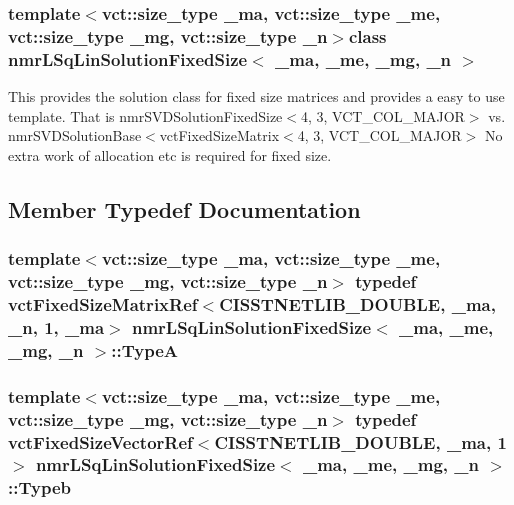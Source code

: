\subsubsection*{template$<$vct\+::size\+\_\+type \+\_\+ma, vct\+::size\+\_\+type \+\_\+me, vct\+::size\+\_\+type \+\_\+mg, vct\+::size\+\_\+type \+\_\+n$>$class nmr\+L\+Sq\+Lin\+Solution\+Fixed\+Size$<$ \+\_\+ma, \+\_\+me, \+\_\+mg, \+\_\+n $>$}

This provides the solution class for fixed size matrices and provides a easy to use template. That is nmr\+S\+V\+D\+Solution\+Fixed\+Size$<$4, 3, V\+C\+T\+\_\+\+C\+O\+L\+\_\+\+M\+A\+J\+O\+R$>$ vs. nmr\+S\+V\+D\+Solution\+Base$<$vct\+Fixed\+Size\+Matrix$<$4, 3, V\+C\+T\+\_\+\+C\+O\+L\+\_\+\+M\+A\+J\+O\+R$>$ No extra work of allocation etc is required for fixed size. 

\subsection{Member Typedef Documentation}
\hypertarget{classnmr_l_sq_lin_solution_fixed_size_a7a9b41c20d4c0b44cdae4bf7b39f7e39}{}
\subsubsection[{Type\+A}]{\setlength{\rightskip}{0pt plus 5cm}template$<$vct\+::size\+\_\+type \+\_\+ma, vct\+::size\+\_\+type \+\_\+me, vct\+::size\+\_\+type \+\_\+mg, vct\+::size\+\_\+type \+\_\+n$>$ typedef {\bf vct\+Fixed\+Size\+Matrix\+Ref}$<$C\+I\+S\+S\+T\+N\+E\+T\+L\+I\+B\+\_\+\+D\+O\+U\+B\+L\+E, \+\_\+ma, \+\_\+n, 1, \+\_\+ma$>$ {\bf nmr\+L\+Sq\+Lin\+Solution\+Fixed\+Size}$<$ \+\_\+ma, \+\_\+me, \+\_\+mg, \+\_\+n $>$\+::{\bf Type\+A}}\label{classnmr_l_sq_lin_solution_fixed_size_a7a9b41c20d4c0b44cdae4bf7b39f7e39}
\hypertarget{classnmr_l_sq_lin_solution_fixed_size_a9fca08d2c610b0087085dd343e5d171b}{}
\subsubsection[{Typeb}]{\setlength{\rightskip}{0pt plus 5cm}template$<$vct\+::size\+\_\+type \+\_\+ma, vct\+::size\+\_\+type \+\_\+me, vct\+::size\+\_\+type \+\_\+mg, vct\+::size\+\_\+type \+\_\+n$>$ typedef {\bf vct\+Fixed\+Size\+Vector\+Ref}$<$C\+I\+S\+S\+T\+N\+E\+T\+L\+I\+B\+\_\+\+D\+O\+U\+B\+L\+E, \+\_\+ma, 1$>$ {\bf nmr\+L\+Sq\+Lin\+Solution\+Fixed\+Size}$<$ \+\_\+ma, \+\_\+me, \+\_\+mg, \+\_\+n $>$\+::{\bf Typeb}}\label{classnmr_l_sq_lin_solution_fixed_size_a9fca08d2c610b0087085dd343e5d171b}
\hypertarget{classnmr_l_sq_lin_solution_fixed_size_a74ac0c633236e0b04e8969f7fbfc92a6}{}
